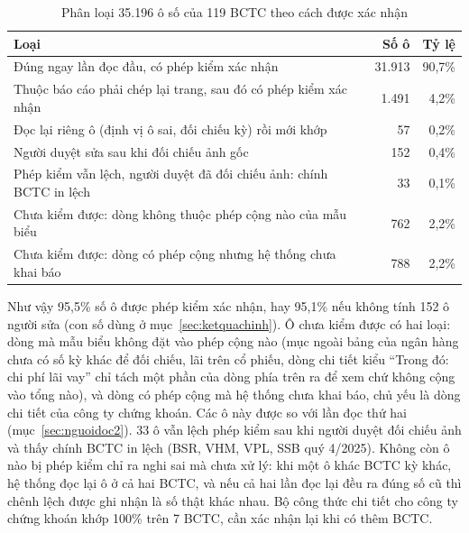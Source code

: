 \documentclass[12pt,a4paper]{report}
\newcommand{\enquote}[1]{“#1”}
\begin{document}
\begin{table}[H]
\centering\small
\caption{Phân loại 35.196 ô số của 119 BCTC theo cách được xác nhận}\label{tab:theoo}
\begin{tabularx}{\linewidth}{@{}Xrr@{}}
\toprule
\textbf{Loại} & \textbf{Số ô} & \textbf{Tỷ lệ} \\ \midrule
Đúng ngay lần đọc đầu, có phép kiểm xác nhận & 31.913 & 90,7\% \\
Thuộc báo cáo phải chép lại trang, sau đó có phép kiểm xác nhận & 1.491 & 4,2\% \\
Đọc lại riêng ô (định vị ô sai, đối chiếu kỳ) rồi mới khớp & 57 & 0,2\% \\
Người duyệt sửa sau khi đối chiếu ảnh gốc & 152 & 0,4\% \\
Phép kiểm vẫn lệch, người duyệt đã đối chiếu ảnh: chính BCTC in lệch & 33 & 0,1\% \\
Chưa kiểm được: dòng không thuộc phép cộng nào của mẫu biểu & 762 & 2,2\% \\
Chưa kiểm được: dòng có phép cộng nhưng hệ thống chưa khai báo & 788 & 2,2\% \\
\bottomrule
\end{tabularx}
\end{table}

Như vậy 95,5\% số ô được phép kiểm xác nhận, hay 95,1\% nếu không tính 152 ô người sửa (con số dùng ở
mục~\ref{sec:ketquachinh}). Ô chưa kiểm được có hai loại: dòng mà mẫu biểu không đặt vào phép cộng nào (mục ngoài bảng
của ngân hàng chưa có số kỳ khác để đối chiếu, lãi trên cổ phiếu, dòng chi tiết kiểu \enquote{Trong đó: chi phí lãi vay} chỉ tách một phần của dòng phía
trên ra để xem chứ không cộng vào tổng nào), và dòng có phép cộng mà hệ thống chưa khai báo, chủ yếu là
dòng chi tiết của công ty chứng khoán. Các ô này được so với lần đọc thứ hai (mục~\ref{sec:nguoidoc2}). 33 ô vẫn lệch
phép kiểm sau khi người duyệt đối chiếu ảnh và thấy chính BCTC in lệch (BSR, VHM, VPL, SSB quý 4/2025). Không còn ô
nào bị phép kiểm chỉ ra nghi sai mà chưa xử lý: khi một ô khác BCTC kỳ khác, hệ thống đọc lại ô ở cả hai BCTC, và nếu cả
hai lần đọc lại đều ra đúng số cũ thì chênh lệch được ghi nhận là số thật khác nhau. Bộ công thức chi tiết cho công ty
chứng khoán khớp 100\% trên 7 BCTC, cần xác nhận lại khi có thêm BCTC.
\end{document}
